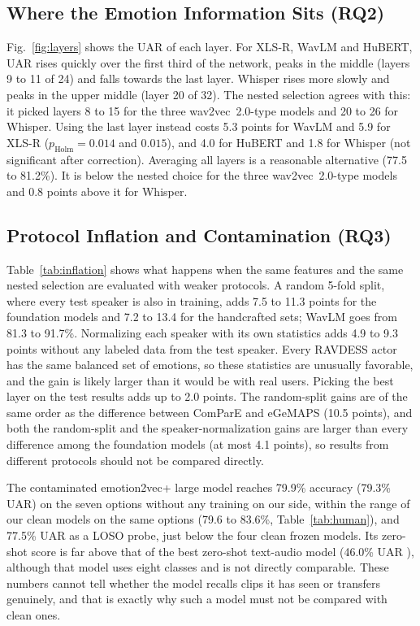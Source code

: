 \documentclass[journal]{IEEEtran}
\begin{document}
\subsection{Where the Emotion Information Sits (RQ2)}
Fig.~\ref{fig:layers} shows the UAR of each layer. For XLS-R, WavLM and HuBERT, UAR rises quickly over the first third of the network, peaks in the middle (layers 9 to 11 of 24) and falls towards the last layer. Whisper rises more slowly and peaks in the upper middle (layer 20 of 32). The nested selection agrees with this: it picked layers 8 to 15 for the three wav2vec~2.0-type models and 20 to 26 for Whisper. Using the last layer instead costs 5.3 points for WavLM and 5.9 for XLS-R ($p_{\text{Holm}} = 0.014$ and $0.015$), and 4.0 for HuBERT and 1.8 for Whisper (not significant after correction). Averaging all layers is a reasonable alternative (77.5 to 81.2\%). It is below the nested choice for the three wav2vec~2.0-type models and 0.8 points above it for Whisper.



\subsection{Protocol Inflation and Contamination (RQ3)}
Table~\ref{tab:inflation} shows what happens when the same features and the same nested selection are evaluated with weaker protocols. A random 5-fold split, where every test speaker is also in training, adds 7.5 to 11.3 points for the foundation models and 7.2 to 13.4 for the handcrafted sets; WavLM goes from 81.3 to 91.7\%. Normalizing each speaker with its own statistics adds 4.9 to 9.3 points without any labeled data from the test speaker. Every RAVDESS actor has the same balanced set of emotions, so these statistics are unusually favorable, and the gain is likely larger than it would be with real users. Picking the best layer on the test results adds up to 2.0 points. The random-split gains are of the same order as the difference between ComParE and eGeMAPS (10.5 points), and both the random-split and the speaker-normalization gains are larger than every difference among the foundation models (at most 4.1 points), so results from different protocols should not be compared directly.

The contaminated emotion2vec+ large model reaches 79.9\% accuracy (79.3\% UAR) on the seven options without any training on our side, within the range of our clean models on the same options (79.6 to 83.6\%, Table~\ref{tab:human}), and 77.5\% UAR as a LOSO probe, just below the four clean frozen models. Its zero-shot score is far above that of the best zero-shot text-audio model (46.0\% UAR \cite{yang2026clsp}), although that model uses eight classes and is not directly comparable. These numbers cannot tell whether the model recalls clips it has seen or transfers genuinely, and that is exactly why such a model must not be compared with clean ones.
\end{document}
